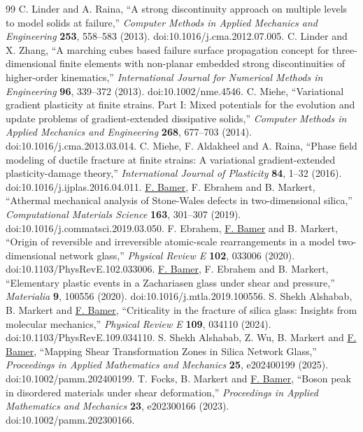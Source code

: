 \documentclass[11pt,a4paper]{article}
\begin{document}
\begin{thebibliography}{99}
 C. Linder and A. Raina, ``A strong discontinuity approach on multiple levels to model solids at failure,'' \emph{Computer Methods in Applied Mechanics and Engineering} \textbf{253}, 558--583 (2013). doi:10.1016/j.cma.2012.07.005.
 C. Linder and X. Zhang, ``A marching cubes based failure surface propagation concept for three-dimensional finite elements with non-planar embedded strong discontinuities of higher-order kinematics,'' \emph{International Journal for Numerical Methods in Engineering} \textbf{96}, 339--372 (2013). doi:10.1002/nme.4546.
 C. Miehe, ``Variational gradient plasticity at finite strains. Part I: Mixed potentials for the evolution and update problems of gradient-extended dissipative solids,'' \emph{Computer Methods in Applied Mechanics and Engineering} \textbf{268}, 677--703 (2014). doi:10.1016/j.cma.2013.03.014.
 C. Miehe, F. Aldakheel and A. Raina, ``Phase field modeling of ductile fracture at finite strains: A variational gradient-extended plasticity-damage theory,'' \emph{International Journal of Plasticity} \textbf{84}, 1--32 (2016). doi:10.1016/j.ijplas.2016.04.011.
 \underline{F. Bamer}, F. Ebrahem and B. Markert, ``Athermal mechanical analysis of Stone-Wales defects in two-dimensional silica,'' \emph{Computational Materials Science} \textbf{163}, 301--307 (2019). doi:10.1016/j.commatsci.2019.03.050.
 F. Ebrahem, \underline{F. Bamer} and B. Markert, ``Origin of reversible and irreversible atomic-scale rearrangements in a model two-dimensional network glass,'' \emph{Physical Review E} \textbf{102}, 033006 (2020). doi:10.1103/PhysRevE.102.033006.
 \underline{F. Bamer}, F. Ebrahem and B. Markert, ``Elementary plastic events in a Zachariasen glass under shear and pressure,'' \emph{Materialia} \textbf{9}, 100556 (2020). doi:10.1016/j.mtla.2019.100556.
 S. Shekh Alshabab, B. Markert and \underline{F. Bamer}, ``Criticality in the fracture of silica glass: Insights from molecular mechanics,'' \emph{Physical Review E} \textbf{109}, 034110 (2024). doi:10.1103/PhysRevE.109.034110.
 S. Shekh Alshabab, Z. Wu, B. Markert and \underline{F. Bamer}, ``Mapping Shear Transformation Zones in Silica Network Glass,'' \emph{Proceedings in Applied Mathematics and Mechanics} \textbf{25}, e202400199 (2025). doi:10.1002/pamm.202400199.
 T. Focks, B. Markert and \underline{F. Bamer}, ``Boson peak in disordered materials under shear deformation,'' \emph{Proceedings in Applied Mathematics and Mechanics} \textbf{23}, e202300166 (2023). doi:10.1002/pamm.202300166.

\end{thebibliography}
\end{document}
